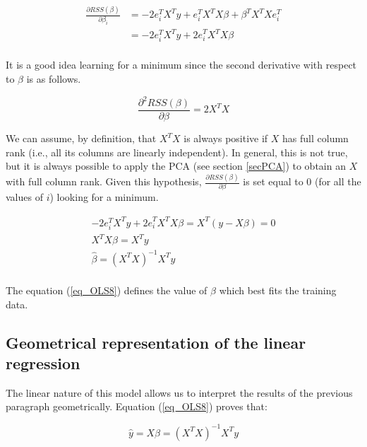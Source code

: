 \begin{equation}
\begin{split}
     \frac{\partial RSS(\beta)}{\partial\beta_i} & =-2e_i^TX^Ty+e_i^TX^TX\beta+\beta^TX^TXe_i^T \\
    & =-2e_i^TX^Ty+{2e}_i^TX^TX\beta \\
\end{split}
\label{eq_OLS6}
\end{equation}

It is a good idea learning for a minimum since the second derivative with respect to $\beta$ is as follows.

\begin{equation}
     \frac{\partial^2RSS(\beta)}{\partial\beta}=2{X}^T{X}
\label{eq_OLS7}
\end{equation}

We can assume, by definition, that $X^TX$ is always positive if $X$ has full column rank (i.e., all its columns are linearly independent). In general, this is not true, but it is always possible to apply the PCA (see section \ref{secPCA}) to obtain an $X$ with full column rank. Given this hypothesis, $\frac{\partial RSS(\beta)}{\partial\beta}$ is set equal to 0 (for all the values of $i$) looking for a minimum.

\begin{equation}
\begin{split}
     -2e_i^TX^Ty+{2e}_i^TX^TX\beta=X^T\left(y-X\beta\right)=0 \\
     X^TX\beta=X^Ty \\
     \hat{\beta}= \left(X^TX\right)^{-1}X^Ty \\
\end{split}
\label{eq_OLS8}
\end{equation}

The equation (\ref{eq_OLS8}) defines the value of $\hat{\beta}$ which best fits the training data.

\subsection{Geometrical representation of the linear regression}
The linear nature of this model allows us to interpret the results of the previous paragraph geometrically. Equation (\ref{eq_OLS8}) proves that:

\begin{equation}
\hat{y}=X\hat{\beta}=\left(X^TX\right)^{-1}X^Ty
\label{eq_OLSgeo1}
\end{equation}

